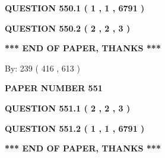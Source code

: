 \documentclass[12pt]{article}
\begin{document}
\vspace{0.2in}
  
{\textbf{\Large{QUESTION
550.1 
 ( 1 , 1 , 6791 )
}}}
  
  
  
\vspace{0.2in}
  
{\textbf{\Large{QUESTION
550.2 
 ( 2 , 2 , 3 )
}}}
  
  
   
   
 \vspace{0.2in}
 
   
   
   
   
\vspace{1.0in} 
{\textbf{\large{ *** END OF PAPER, THANKS *** }}} 
   
   
\hspace{1.0in} By: 
 239 ( 416 ,  613 )
   
   
   
   
\newpage 
\setcounter{page}{ 
   551001 } 
   
   
   
   
 {\textbf{ \Large{ PAPER NUMBER  551  }}}
   
   
\vspace{0.2in}
   
   
   
   
   
   
 \vspace{0.2in}
 
 
 
 
   
   
  
\vspace{0.2in}
  
{\textbf{\Large{QUESTION
551.1 
 ( 2 , 2 , 3 )
}}}
  
  
  
\vspace{0.2in}
  
{\textbf{\Large{QUESTION
551.2 
 ( 1 , 1 , 6791 )
}}}
  
  
   
   
 \vspace{0.2in}
 
   
   
   
   
\vspace{1.0in} 
{\textbf{\large{ *** END OF PAPER, THANKS *** }}} 
   
\end{document}
